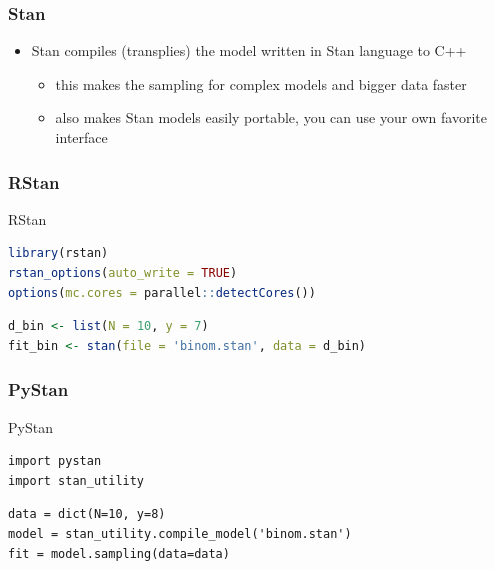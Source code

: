 \documentclass[10pt,handout]{beamer}
\begin{document}



\begin{frame}

\frametitle{Stan}

  \begin{itemize}
  \item Stan compiles (transplies) the model written in Stan language to C++
    \begin{itemize}
    \item this makes the sampling for complex models and bigger data faster
    \item also makes Stan models easily portable, you can use your own
      favorite interface
    \end{itemize}
  \end{itemize}

\end{frame}

\begin{frame}[fragile]

\frametitle{RStan}

  {\small\color{gray}
    {
      RStan
\begin{lstlisting}[language=R]
library(rstan)
rstan_options(auto_write = TRUE)
options(mc.cores = parallel::detectCores())
\end{lstlisting}
    }
{
\begin{lstlisting}[language=R]
d_bin <- list(N = 10, y = 7)
fit_bin <- stan(file = 'binom.stan', data = d_bin)
\end{lstlisting}
}
}
\end{frame}

\begin{frame}[fragile]

\frametitle{PyStan}

  {\small\color{gray}
{
      PyStan
\begin{lstlisting}
import pystan
import stan_utility
\end{lstlisting}
    }
    {
\begin{lstlisting}
data = dict(N=10, y=8)
model = stan_utility.compile_model('binom.stan')
fit = model.sampling(data=data)
\end{lstlisting}
    }
  }
\end{frame}
\end{document}
